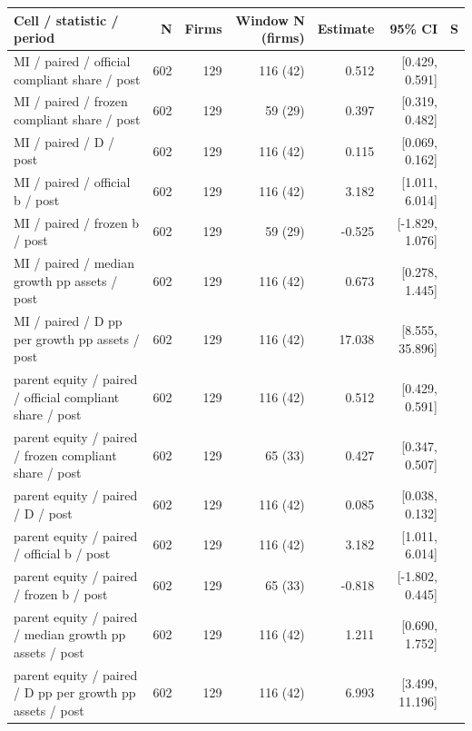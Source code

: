 \begingroup\scriptsize\setlength{\tabcolsep}{3pt}
\begin{threeparttable}
\begin{tabular}{p{5.7cm}rrrrrl}
\toprule
Cell / statistic / period & N & Firms & Window N (firms) & Estimate & 95\% CI & S \\
\midrule
MI / paired / official compliant share / post & 602 & 129 & 116 (42) & 0.512 & [0.429, 0.591] &  \\
MI / paired / frozen compliant share / post & 602 & 129 & 59 (29) & 0.397 & [0.319, 0.482] &  \\
MI / paired / D / post & 602 & 129 & 116 (42) & 0.115 & [0.069, 0.162] &  \\
MI / paired / official b / post & 602 & 129 & 116 (42) & 3.182 & [1.011, 6.014] &  \\
MI / paired / frozen b / post & 602 & 129 & 59 (29) & -0.525 & [-1.829, 1.076] &  \\
MI / paired / median growth pp assets / post & 602 & 129 & 116 (42) & 0.673 & [0.278, 1.445] &  \\
MI / paired / D pp per growth pp assets / post & 602 & 129 & 116 (42) & 17.038 & [8.555, 35.896] &  \\
parent equity / paired / official compliant share / post & 602 & 129 & 116 (42) & 0.512 & [0.429, 0.591] &  \\
parent equity / paired / frozen compliant share / post & 602 & 129 & 65 (33) & 0.427 & [0.347, 0.507] &  \\
parent equity / paired / D / post & 602 & 129 & 116 (42) & 0.085 & [0.038, 0.132] &  \\
parent equity / paired / official b / post & 602 & 129 & 116 (42) & 3.182 & [1.011, 6.014] &  \\
parent equity / paired / frozen b / post & 602 & 129 & 65 (33) & -0.818 & [-1.802, 0.445] &  \\
parent equity / paired / median growth pp assets / post & 602 & 129 & 116 (42) & 1.211 & [0.690, 1.752] &  \\
parent equity / paired / D pp per growth pp assets / post & 602 & 129 & 116 (42) & 6.993 & [3.499, 11.196] &  \\
\bottomrule
\end{tabular}
\begin{tablenotes}[flushleft]\footnotesize

\end{tablenotes}
\end{threeparttable}
